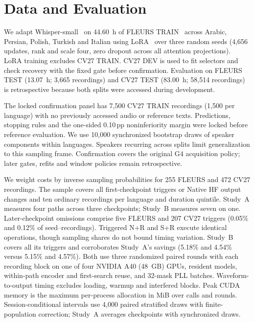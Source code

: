 \documentclass[conference,letterpaper]{IEEEtran}
\begin{document}
\section{Data and Evaluation}
We adapt Whisper-small~\cite{whisper} on 44.60~h of FLEURS TRAIN~\cite{fleurs} across Arabic, Persian, Polish, Turkish and Italian using LoRA~\cite{lora} over three random seeds (4,656 updates, rank and scale four, zero dropout across all attention projections). LoRA training excludes CV27 TRAIN. CV27 DEV is used to fit selectors and check recovery with the fixed gate before confirmation. Evaluation on FLEURS TEST (13.07~h; 3,665 recordings) and CV27 TEST (83.00~h; 58,514 recordings)~\cite{cv2020} is retrospective because both splits were accessed during development.

The locked confirmation panel has 7,500 CV27 TRAIN recordings (1,500 per language) with no previously accessed audio or reference texts. Predictions, stopping rules and the one-sided 0.10\,pp noninferiority margin were locked before reference evaluation. We use 10,000 synchronized bootstrap draws of speaker components within languages. Speakers recurring across splits limit generalization to this sampling frame. Confirmation covers the original G4 acquisition policy; later gates, refits and window policies remain retrospective.



We weight costs by inverse sampling probabilities for 255 FLEURS and 472 CV27 recordings. The sample covers all first-checkpoint triggers or Native HF output changes and ten ordinary recordings per language and duration quintile. Study~A measures four paths across three checkpoints; Study~B measures seven on one. Later-checkpoint omissions comprise five FLEURS and 207 CV27 triggers (0.05\% and 0.12\% of seed--recordings). Triggered N+R and S+R execute identical operations, though sampling shares do not bound timing variation. Study~B covers all its triggers and corroborates Study~A's savings (5.18\% and 4.54\% versus 5.15\% and 4.57\%). Both use three randomized paired rounds with each recording block on one of four NVIDIA A40 (48~GB) GPUs, resident models, within-path encoder and first-search reuse, and 32-mask PLL batches. Waveform-to-output timing excludes loading, warmup and interfered blocks. Peak CUDA memory is the maximum per-process allocation in MiB over calls and rounds. Session-conditional intervals use 4,000 paired stratified draws with finite-population correction; Study~A averages checkpoints with synchronized draws.
\end{document}
